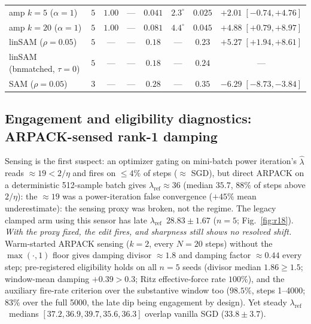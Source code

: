 \documentclass{article}
\theoremstyle{plain}
\theoremstyle{definition}
\theoremstyle{remark}
\newcommand{\lref}{\ensuremath{\lambda_{\mathrm{ref}}}}
\begin{document}
\begin{table}[!ht]
{\begin{tabular}{llcccccc}
amp $k{=}5$ ($\alpha{=}1$)   & $5$ & $1.00$ & --- & $0.041$ & $2.3^{\circ}$ & $0.025$ & $+2.01\;[-0.74,+4.76]$ \\
amp $k{=}20$ ($\alpha{=}1$)  & $5$ & $1.00$ & --- & $0.081$ & $4.4^{\circ}$ & $0.045$ & $+4.88\;[+0.79,+8.97]$ \\
\midrule
linSAM ($\rho{=}0.05$)        & $5$ & --- & --- & $0.18$ & --- & $0.23$ & $+5.27\;[+1.94,+8.61]$ \\
linSAM (bnmatched, $\tau{=}0$)& $5$ & --- & --- & $0.18$ & --- & $0.24$ & --- \\
SAM ($\rho{=}0.05$)           & $3$ & --- & --- & $0.28$ & --- & $0.35$ & $-6.29\;[-8.73,-3.84]$ \\
\bottomrule
\end{tabular}}
\end{table}

\subsection{Engagement and eligibility diagnostics: ARPACK-sensed rank-1 damping}
\label{sub:engagement}
Sensing is the first suspect: an optimizer
gating on mini-batch power iteration's $\hat\lambda$ reads
$\approx\!19<2/\eta$ and fires on $\le\!4\%$ of steps ($\approx$ SGD),
but direct ARPACK on a deterministic 512-sample batch gives
$\lref\!\approx\!36$ (median $35.7$, $88\%$ of steps above $2/\eta$):
the $\approx\!19$ was a power-iteration false convergence ($+45\%$ mean
underestimate): the sensing proxy was broken, not the regime. The
legacy clamped arm using this sensor has late
\lref\ $28.83\pm1.67$ ($n{=}5$; Fig.~\ref{fig:r18}).
\emph{With the proxy fixed, the edit fires, and sharpness still shows
no resolved shift.} Warm-started ARPACK sensing ($k{=}2$, every $N{=}20$ steps)
without the $\max(\cdot,1)$ floor gives damping divisor $\approx\!1.8$
and damping factor $\approx\!0.44$ every step; pre-registered
eligibility holds on all $n{=}5$ seeds (divisor median $1.86\geq1.5$;
window-mean damping $+0.39>0.3$; Ritz effective-force rate $100\%$), and
the auxiliary fire-rate criterion over the substantive window too
($98.5\%$, steps 1--4000; $83\%$ over the full 5000, the late dip being
engagement by design). Yet steady \lref\ medians
$[37.2,36.9,39.7,35.6,36.3]$ overlap vanilla SGD ($33.8\pm3.7$).
\end{document}
